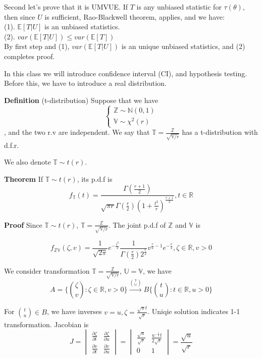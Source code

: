 \documentclass[a4paper,12pt]{article}
\begin{document}
Second let's prove that it is UMVUE. If $T$ is any unbiased statistic for $\tau(\theta)$, then since $U$ is sufficient, Rao-Blackwell theorem, applies, and we have:\\
(1). $\mathbb{E}[ T | U ]$ is an unbiased statistics.\\
(2). $var( \mathbb{E}[ T | U ] ) \leq var( \mathbb{E}[ T ] )$\\

By first step and (1), $var( \mathbb{E}[ T | U ] )$ is an unique unbiased statistics, and (2) completes proof.


\pagebreak
In this class we will introduce confidence interval (CI), and hypothesis testing. Before this, we have to introduce a real distribution.

\textbf{Definition} (t-distribution) Suppose that we have
$$
\begin{cases}
\mathbb{Z} \sim \mathbb{N}(0, 1) \\
\mathbb{V} \sim \mathbb{\chi}^2(r)
\end{cases}
$$
, and the two r.v are independent. We say that $\mathbb{T} = \frac{\mathbb{Z}}{\sqrt{\mathbb{V}/r}}$ has a t-distribution with d.f.r.

We also denote $\mathbb{T}\sim t(r)$.

\textbf{Theorem} If  $\mathbb{T}\sim t(r)$, its p.d.f is
$$f_\mathbb{T}(t) = \frac{\Gamma(\frac{r+1}{2})}{\sqrt{\pi r}\Gamma(\frac{r}{2})(1+\frac{t^2}{r})^\frac{r+1}{2}}, t\in\mathbb{R}$$

\textbf{Proof} Since $\mathbb{T}\sim t(r)$, $\mathbb{T} = \frac{\mathbb{Z}}{\sqrt{\mathbb{V}/r}}$. The joint p.d.f of $\mathbb{Z}$ and $\mathbb{V}$ is

$$f_{\mathbb{Z}\mathbb{V}}(\zeta, v) = 
\frac{1}{\sqrt{2\pi}} e^{-\frac{\zeta^2}{2}} \frac{1}{\Gamma(\frac{r}{2})2^{\frac{r}{2}}}v^{\frac{r}{2}-1}e^{-\frac{v}{2}}
, \zeta\in\mathbb{R}, v>0 $$

We consider transformation $\mathbb{T} = \frac{\mathbb{Z}}{\sqrt{\mathbb{V}/r}}$, $\mathbb{U} = \mathbb{V}$, we have
$$A = \big\{ {\zeta \choose v}: \zeta\in\mathbb{R}, v>0 \big\} \overset{{\mathbb{T} \choose \mathbb{U}}}{\to} B \big\{ {t \choose u}:t\in\mathbb{R}, u>0 \big\}$$

For ${t \choose u} \in B$, we have inverses $v=u, \zeta=\frac{\sqrt{u}t}{\sqrt{r}}$. Uniqie solution indicates 1-1 transformation. Jacobian is
$$J = 
\begin{vmatrix}
\frac{\partial \zeta}{\partial t} & \frac{\partial \zeta}{\partial u} \\
\frac{\partial v}{\partial t} & \frac{\partial v}{\partial u}
\end{vmatrix} = 
\begin{vmatrix}
\frac{\sqrt{u}}{\sqrt{r}} & \frac{u^{-\frac{1}{2}}t}{2\sqrt{r}} \\
0 & 1
\end{vmatrix}
= \frac{\sqrt{u}}{\sqrt{r}}$$
\end{document}
